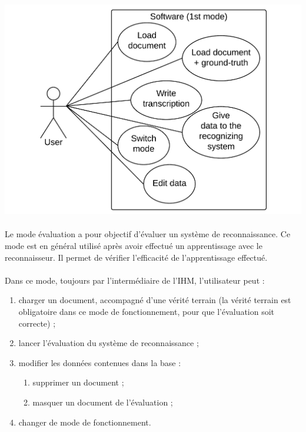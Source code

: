 \begin{mdframed}[frametitle={Figure 2 : Diagramme de cas d'utilisation (mode apprentissage)}, innerbottommargin=10]
\begin{center}
\includegraphics[scale=0.4]{Usecase_1.pdf}
\end{center}
\end{mdframed}

\paragraph{}

Le mode évaluation a pour objectif d’évaluer un système de reconnaissance. Ce
mode est en général utilisé après avoir effectué un apprentissage avec le
reconnaisseur. Il permet de vérifier l’efficacité de l’apprentissage effectué.

\paragraph{}

Dans ce mode, toujours par l’intermédiaire de l’IHM, l’utilisateur peut :
\begin{enumerate}
\item charger un document, accompagné d’une vérité terrain (la vérité terrain
est obligatoire dans ce mode de fonctionnement, pour que l’évaluation soit
correcte) ;
\item lancer l’évaluation du système de reconnaissance ;
\item modifier les données contenues dans la base :
\begin{enumerate}
\item supprimer un document ;
\item masquer un document de l’évaluation ;
\end{enumerate}
\item changer de mode de fonctionnement.
\end{enumerate}

